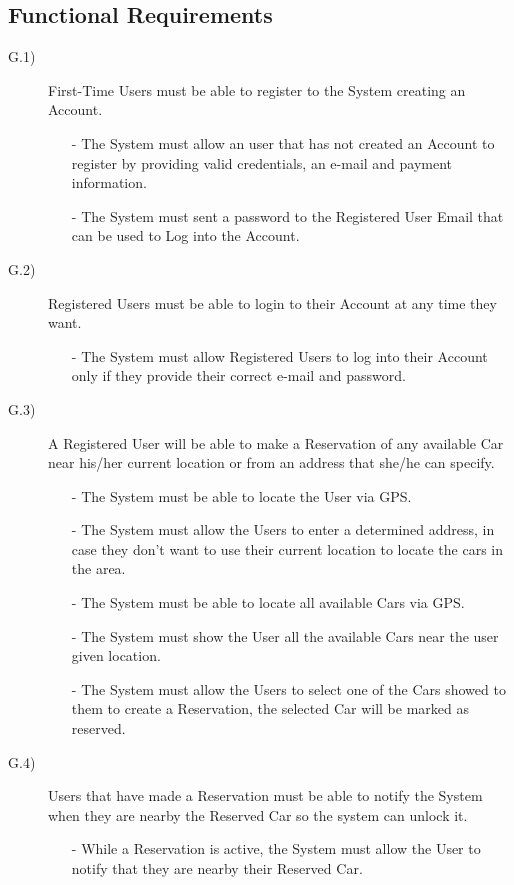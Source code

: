 \documentclass[a4paper]{article}
\begin{document}
\subsection{Functional Requirements}
\begin{description}
\item [G.1)]First-Time Users must be able to register to the System creating an Account. 
\begin{itemize}
	\item[-]The System must allow an user that has not created an Account to register by providing valid credentials, an e-mail and payment information.
	\item[-]The System must sent a password to the Registered User Email that can be used to Log into the Account.
\end{itemize}
\item [G.2)]Registered Users must be able to login to their Account at any time they want.
\begin{itemize}
	\item[-]The System must allow Registered Users to log into their Account only if they provide their correct e-mail and password.
\end{itemize}
\item [G.3)]A Registered User will be able to make a Reservation of any available Car near his/her current location or from an address that she/he can specify.
\begin{itemize}
	\item[-]The System must be able to locate the User via GPS.
	\item[-]The System must allow the Users to enter a determined address, in case they don't want to use their current location to locate the cars in the area.
	\item[-]The System must be able to locate all available Cars via GPS.
	\item[-]The System must show the User all the available Cars near the user given location.
	\item[-]The System must allow the Users to select one of the Cars showed to them to create a Reservation, the selected Car will be marked as reserved.
\end{itemize}
\item [G.4)]Users that have made a Reservation must be able to notify the System when they are nearby the Reserved Car so the system can unlock it.
\begin{itemize}
	\item[-]While a Reservation is active, the System must allow the User to notify that they are nearby their Reserved Car.

\end{itemize}
\end{description}
\end{document}
